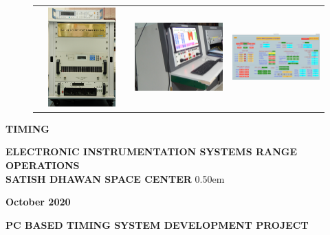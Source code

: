 \documentclass[a4paper, 12pt, oneside]{Thesis}  %
\begin{document}
\begin{center}
\begin{figure}[H]
\begin{tabular}{ccc}
				\includegraphics[height=1.5in,width=1.65in] {./NewPA.jpg}&\includegraphics[height=1.5in,width=1.65in]{./Console1.jpg}&\includegraphics[height=1.5in,width=1.65in]{./MainPage.png}\\
				
			\end{tabular}
			
		\end{figure}
		
		\vspace*{0.25in}
		
	\end{center} 
	\begin{center}
		{\bf \large \MakeUppercase{ TIMING}\par} 
		{\hspace*{0.4in} \bf ELECTRONIC INSTRUMENTATION SYSTEMS \newline RANGE OPERATIONS\\
			SATISH DHAWAN SPACE CENTER}
		\vglue 0.50em
		{\bf \large October 2020\par }%
	\end{center}
	
	
	
	
	\newpage
	\vspace*{36pt}
	\begin{center}
		
		
		\let \footnote \thanks
		\vglue 0in %
		\begin{spacing}{1}
			\textbf{\Large  PC BASED TIMING SYSTEM DEVELOPMENT PROJECT}
		\end{spacing}
		
	\end{center}  
	
\end{document}
